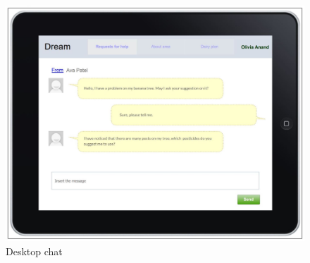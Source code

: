 \begin{figure}[H]
	\centering
    \includegraphics[page=1, width=\textwidth]{Images/desktop_chat.JPG}

	\caption{\label{fig:FE_image4}Desktop chat}

\end{figure}